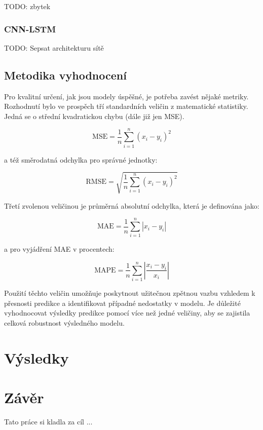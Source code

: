 \documentclass[FM,BP,fonts]{tulthesis}
\begin{document}
TODO: zbytek

\subsection{CNN-LSTM}

TODO: Sepsat architekturu sítě

\newpage
\section{Metodika vyhodnocení}\label{section:error-matrix}
Pro kvalitní určení, jak jsou modely úspěšné, je potřeba zavést nějaké metriky. Rozhodnutí bylo ve prospěch tří standardních veličin z matematické statistiky. Jedná se o střední kvadratickou chybu (dále již jen MSE). 

\begin{equation}
	\text{MSE} = \frac{1}{n}\sum_{i=1}^{n}(x_i-y_i)^2 
\end{equation}

a též směrodatná odchylka pro správné jednotky:

\begin{equation}
	\text{RMSE} = \sqrt{\frac{1}{n}\sum_{i=1}^{n}(x_i-y_i)^2}
\end{equation}

Třetí zvolenou veličinou je průměrná absolutní odchylka, která je definována jako:

\begin{equation}
	\text{MAE} = \frac{1}{n}\sum_{i=1}^{n}|x_i-y_i| 
\end{equation}

a pro vyjádření MAE v procentech: 

\begin{equation}
	\text{MAPE} = \frac{1}{n}\sum_{i=1}^{n}|\frac{x_i-y_i}{x_i}| 
\end{equation}

Použití těchto veličin umožňuje poskytnout užitečnou zpětnou vazbu vzhledem k přesnosti predikce a identifikovat případné nedostatky v modelu. Je důležité vyhodnocovat výsledky predikce pomocí více než jedné veličiny, aby se zajistila celková robustnost výsledného modelu.


\chapter{Výsledky}\label{Výsledky}



\chapter{Závěr}
Tato práce si kladla za cíl ... 
\end{document}
